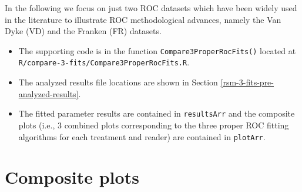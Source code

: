 \documentclass[
]{book}
\newenvironment{Shaded}{\begin{snugshade}}{\end{snugshade}}
\newcommand{\CommentTok}[1]{\textcolor[rgb]{0.56,0.35,0.01}{\textit{#1}}}
\newcommand{\ControlFlowTok}[1]{\textcolor[rgb]{0.13,0.29,0.53}{\textbf{#1}}}
\newcommand{\DataTypeTok}[1]{\textcolor[rgb]{0.13,0.29,0.53}{#1}}
\newcommand{\DecValTok}[1]{\textcolor[rgb]{0.00,0.00,0.81}{#1}}
\newcommand{\KeywordTok}[1]{\textcolor[rgb]{0.13,0.29,0.53}{\textbf{#1}}}
\newcommand{\NormalTok}[1]{#1}
\newcommand{\OperatorTok}[1]{\textcolor[rgb]{0.81,0.36,0.00}{\textbf{#1}}}
\newcommand{\StringTok}[1]{\textcolor[rgb]{0.31,0.60,0.02}{#1}}
\providecommand{\tightlist}{%
  \setlength{\itemsep}{0pt}\setlength{\parskip}{0pt}}
\begin{document}
In the following we focus on just two ROC datasets which have been widely used in the literature to illustrate ROC methodological advances, namely the Van Dyke (VD) and the Franken (FR) datasets.

\begin{Shaded}
\end{Shaded}

\begin{itemize}
\tightlist
\item
  The supporting code is in the function \texttt{Compare3ProperRocFits()} located at \texttt{R/compare-3-fits/Compare3ProperRocFits.R}.
\item
  The analyzed results file locations are shown in Section \ref{rsm-3-fits-pre-analyzed-results}.
\item
  The fitted parameter results are contained in \texttt{resultsArr} and the composite plots (i.e., 3 combined plots corresponding to the three proper ROC fitting algorithms for each treatment and reader) are contained in \texttt{plotArr}.
\end{itemize}

\hypertarget{rsm-3-fits-composite-plots}{%
\section{Composite plots}\label{rsm-3-fits-composite-plots}}
\end{document}
